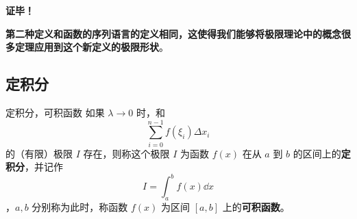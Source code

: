 \textbf{证毕！}

\textbf{第二种定义和函数的序列语言的定义相同，这使得我们能够将极限理论中的概念很多定理应用到这个新定义的极限形状}。
\subsection{定积分}
\begin{definition}{定积分，可积函数}
如果 $\lambda\rightarrow0$ 时，和  
\begin{equation}
\sum_{i=0}^{n-1}f(\xi_i)\Delta x_i
\end{equation}
的（有限）极限 $I$ 存在，则称这个极限 $I$ 为函数 $f(x)$ 在从 $a$ 到 $b$ 的区间上的\textbf{定积分}，并记作
\begin{equation}
I=\int_a^bf(x)\dd x
\end{equation}
，$a,b$ 分别称为此时，称函数 $f(x)$ 为区间 $[a,b]$ 上的\textbf{可积函数}。
\end{definition}